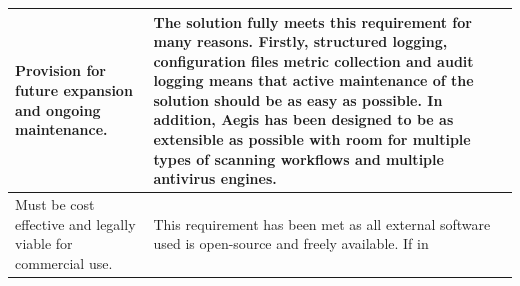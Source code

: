 \documentclass[12pt, conference, final, a4paper, onecolumn, compsoc]{IEEEtran}
\begin{document}
\begin{table}[H]
\begin{tabular}{|p{}|p{}|}
    Provision for future expansion and ongoing maintenance. & The solution fully
                                                             meets this
                                                             requirement for
                                                             many reasons.
                                                             Firstly, structured
                                                             logging,
                                                             configuration files
                                                             metric collection
                                                             and audit logging
                                                             means that
                                                             active maintenance
                                                             of the solution
                                                             should be as easy
                                                             as possible. In
                                                             addition, Aegis has
                                                             been designed to be
                                                             as extensible as
                                                             possible with room
                                                             for multiple types
                                                             of scanning
                                                             workflows and
                                                             multiple antivirus engines.
    \\ \hline
    Must be cost effective and legally viable for commercial use. & This
                                                                    requirement
                                                                    has been met
                                                                    as all
                                                                    external
                                                                    software
                                                                    used is
                                                                    open-source
                                                                    and freely
                                                                    available.
                                                                    If in

\end{tabular}
\end{table}
\end{document}
